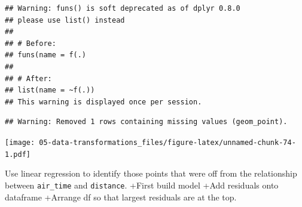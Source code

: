 \documentclass[]{book}
\newenvironment{Shaded}{\begin{snugshade}}{\end{snugshade}}
\newcommand{\DataTypeTok}[1]{\textcolor[rgb]{0.13,0.29,0.53}{#1}}
\newcommand{\DecValTok}[1]{\textcolor[rgb]{0.00,0.00,0.81}{#1}}
\newcommand{\KeywordTok}[1]{\textcolor[rgb]{0.13,0.29,0.53}{\textbf{#1}}}
\newcommand{\NormalTok}[1]{#1}
\newcommand{\OperatorTok}[1]{\textcolor[rgb]{0.81,0.36,0.00}{\textbf{#1}}}
\newcommand{\OtherTok}[1]{\textcolor[rgb]{0.56,0.35,0.01}{#1}}
\newcommand{\StringTok}[1]{\textcolor[rgb]{0.31,0.60,0.02}{#1}}
\theoremstyle{definition}
\theoremstyle{definition}
\theoremstyle{definition}
\theoremstyle{remark}
\begin{document}
\begin{Shaded}
\end{Shaded}

\begin{verbatim}
## Warning: funs() is soft deprecated as of dplyr 0.8.0
## please use list() instead
## 
## # Before:
## funs(name = f(.)
## 
## # After: 
## list(name = ~f(.))
## This warning is displayed once per session.
\end{verbatim}

\begin{verbatim}
## Warning: Removed 1 rows containing missing values (geom_point).
\end{verbatim}

\texttt{[image: 05-data-transformations\_files/figure-latex/unnamed-chunk-74-1.pdf]}

Use linear regression to identify those points that were off from the
relationship between \texttt{air\_time} and \texttt{distance}. +First
build model +Add residuals onto dataframe +Arrange df so that largest
residuals are at the top.
\end{document}
